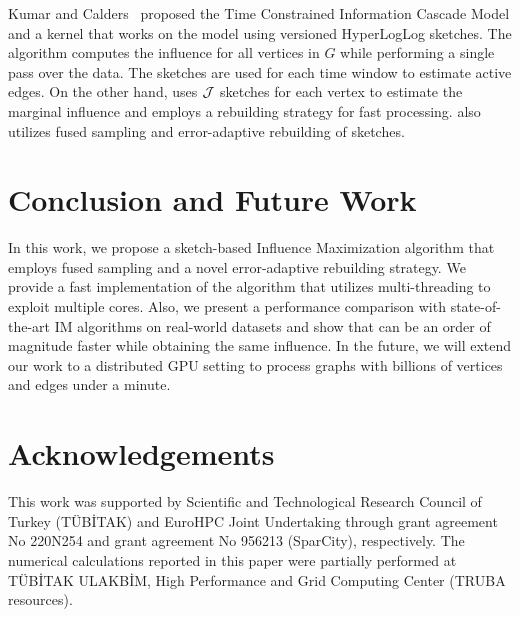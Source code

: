 \documentclass[final,5p,times,twocolumn]{elsarticle}
\newcommand\acro{{\sc{HyperFuseR\xspace}\xspace}\xspace}
\newcommand\ggx[1]{\textcolor{blue}{#1}}
\begin{document}
Kumar and Calders~\cite{kumar2017information} proposed the Time Constrained Information Cascade Model and a kernel that works on the model using versioned HyperLogLog sketches. The algorithm computes the influence for all vertices in $G$ while performing a single pass over the data. The sketches are used for each time window to estimate active edges. On the other hand, \acro uses ${\cal J}$ sketches for each vertex to estimate the marginal influence and employs a rebuilding strategy for fast processing. \acro also utilizes fused sampling and error-adaptive rebuilding of sketches.

\section{Conclusion and Future Work}\label{sec:conclusion}

In this work, we propose a sketch-based Influence Maximization algorithm that employs fused sampling and a novel error-adaptive rebuilding strategy. We provide a fast implementation of the algorithm that utilizes multi-threading to exploit multiple cores. Also, we present a performance comparison with state-of-the-art IM algorithms on real-world datasets and show that \acro{} can be an order of magnitude faster while obtaining the same influence. 
In the future, we will extend our work to a distributed GPU setting to process graphs with billions of vertices and edges under a minute. 



\section*{Acknowledgements}

This work was supported by Scientific and Technological Research Council of Turkey (TÜBİTAK) and EuroHPC Joint Undertaking through grant agreement No 220N254 and grant agreement No 956213 (SparCity), respectively. The numerical calculations reported in this paper were partially performed at T{\"{U}}B\.{I}TAK ULAKB\.{I}M, High Performance and Grid Computing Center (TRUBA resources).
\end{document}
